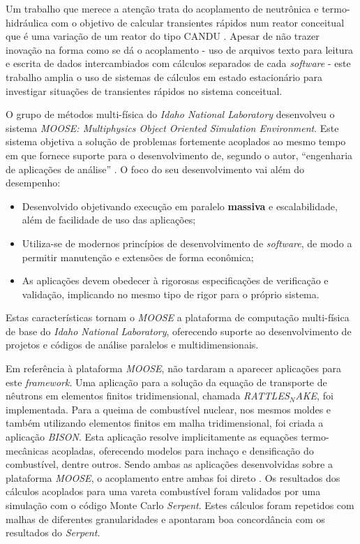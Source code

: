Um trabalho que merece a atenção trata do acoplamento de neutrônica e termo-hidráulica com o objetivo
de calcular transientes rápidos num reator conceitual que é uma variação de um reator do tipo CANDU
\cite{Hummel2016}. Apesar de não trazer inovação na forma como se dá o acoplamento - uso de arquivos
texto para leitura e escrita de dados intercambiados com cálculos separados de cada \textit{software} -
este trabalho amplia o uso de sistemas de cálculos em estado estacionário para investigar situações
de transientes rápidos no sistema conceitual.




O grupo
de métodos multi-física do \textit{Idaho National Laboratory} desenvolveu o sistema
\textit{MOOSE: Multiphysics Object Oriented Simulation Environment}. Este sistema objetiva
a solução de problemas fortemente acoplados ao mesmo tempo em que fornece suporte para
o desenvolvimento de, segundo o autor, ``engenharia de aplicações de análise''
\cite{Gaston2009}. O foco do seu desenvolvimento vai além do desempenho:
\begin{itemize}
\item Desenvolvido objetivando execução em paralelo \textbf{massiva} e escalabilidade,
  além de facilidade de uso das aplicações;
\item Utiliza-se de modernos princípios de desenvolvimento de \textit{software}, de modo
  a permitir manutenção e extensões de forma econômica;
\item As aplicações devem obedecer à rigorosas especificações de verificação e validação,
  implicando no mesmo tipo de rigor para o próprio sistema.
\end{itemize}
Estas características tornam o \textit{MOOSE} a plataforma de computação multi-física
de base do \textit{Idaho National Laboratory}, oferecendo suporte ao desenvolvimento
de projetos e códigos de análise paralelos e multidimensionais.

Em referência à plataforma \textit{MOOSE}, não tardaram a aparecer aplicações para
este \textit{framework}. Uma aplicação para a solução da equação de transporte
de nêutrons em elementos finitos tridimensional, chamada \textit{RATTLES$_{N}$AKE},
foi implementada. Para a queima de combustível nuclear, nos mesmos moldes e
também utilizando elementos finitos em malha tridimensional, foi criada a aplicação
\textit{BISON}. Esta aplicação resolve implicitamente as equações termo-mecânicas
acopladas, oferecendo modelos para inchaço e densificação do combustível, dentre outros.
Sendo ambas as aplicações desenvolvidas sobre a plataforma \textit{MOOSE}, o acoplamento
entre ambas foi direto \cite{Gleicher2014}.
Os resultados dos cálculos acoplados para uma vareta combustível foram validados por uma simulação com o código Monte Carlo \textit{Serpent}.
Estes cálculos foram repetidos com malhas de diferentes granularidades e apontaram boa
concordância com os resultados do \textit{Serpent}.

